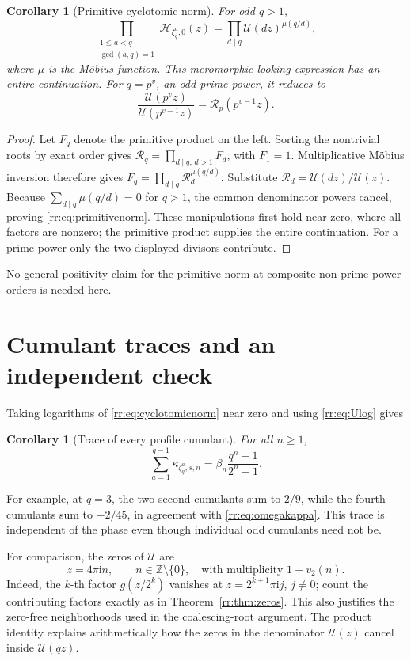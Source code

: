 \documentclass[11pt,a4paper,oneside,openany]{book}
\numberwithin{equation}{chapter}
\newtheorem{corollary}[theorem]{Corollary}
\theoremstyle{definition}
\theoremstyle{remark}
\newcommand{\Z}{\mathbb Z}
\newcommand{\ii}{\mathrm i}
\newcommand{\Up}{\mathcal U}
\newcommand{\Rp}{\mathcal R}
\newcommand{\Hp}{\mathcal H}
\begin{document}
\begin{corollary}[Primitive cyclotomic norm]
For odd \(q>1\),
\begin{equation}
 \prod_{\substack{1\leq a<q\\\gcd(a,q)=1}}\Hp_{\zeta_q^a,0}(z)
 =\prod_{d\mid q}\Up(dz)^{\mu(q/d)},
 \label{rr:eq:primitivenorm}
\end{equation}
where \(\mu\) is the M\"obius function. This meromorphic-looking expression has an entire continuation. For \(q=p^v\), an odd prime power, it reduces to
\begin{equation}
 \frac{\Up(p^vz)}{\Up(p^{v-1}z)}=\Rp_p(p^{v-1}z).
\end{equation}
\end{corollary}
\begin{proof}
Let \(F_q\) denote the primitive product on the left. Sorting the nontrivial roots by exact order gives
\(\Rp_q=\prod_{d\mid q,\,d>1}F_d\), with \(F_1=1\).
Multiplicative M\"obius inversion therefore gives
\(F_q=\prod_{d\mid q}\Rp_d^{\mu(q/d)}\).
Substitute \(\Rp_d=\Up(dz)/\Up(z)\). Because \(\sum_{d\mid q}\mu(q/d)=0\) for \(q>1\), the common denominator powers cancel, proving \eqref{rr:eq:primitivenorm}. These manipulations first hold near zero, where all factors are nonzero; the primitive product supplies the entire continuation. For a prime power only the two displayed divisors contribute.
\end{proof}
No general positivity claim for the primitive norm at composite non-prime-power orders is needed here.

\section{Cumulant traces and an independent check}
Taking logarithms of \eqref{rr:eq:cyclotomicnorm} near zero and using \eqref{rr:eq:Ulog} gives
\begin{corollary}[Trace of every profile cumulant]
For all \(n\geq1\),
\begin{equation}
 \sum_{a=1}^{q-1}\kappa_{\zeta_q^a,s,n}
 =\beta_n\frac{q^n-1}{2^n-1}.
 \label{rr:eq:cumulanttrace}
\end{equation}
\end{corollary}
For example, at \(q=3\), the two second cumulants sum to \(2/9\), while the fourth cumulants sum to \(-2/45\), in agreement with \eqref{rr:eq:omegakappa}. This trace is independent of the phase even though individual odd cumulants need not be.

For comparison, the zeros of \(\Up\) are
\begin{equation}
 z=4\pi\ii n,\qquad n\in\Z\setminus\{0\},
 \quad\text{with multiplicity }1+v_2(n).
 \label{rr:eq:Uzeros}
\end{equation}
Indeed, the \(k\)-th factor \(g(z/2^k)\) vanishes at \(z=2^{k+1}\pi\ii j\), \(j\ne0\); count the contributing factors exactly as in Theorem~\ref{rr:thm:zeros}. This also justifies the zero-free neighborhoods used in the coalescing-root argument. The product identity explains arithmetically how the zeros in the denominator \(\Up(z)\) cancel inside \(\Up(qz)\).
\end{document}
